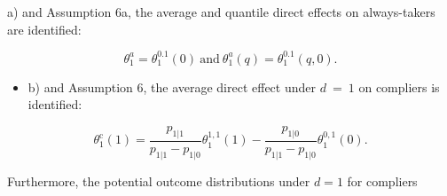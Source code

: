 \documentclass{article}
\begin{document}
a) and Assumption 6a, the average and quantile direct effects on always-takers
are identified:


\begin{equation}
\theta _ { 1 } ^ { a } = \theta _ { 1 } ^ { 0. 1 } ( 0 ) \mathrm { ~ a n d ~ } \theta _ { 1 } ^ { a } ( q ) = \theta _ { 1 } ^ { 0. 1 } ( q, 0 ).
\end{equation}

\begin{itemize}
\item b) and Assumption 6, the average direct effect under $d ~ = ~ 1$ on compliers is
identified:

\end{itemize}

\begin{equation}
\theta _ { 1 } ^ { \mathrm { c } } ( 1 ) = \frac { p _ { 1 | 1 } } { p _ { 1 | 1 } - p _ { 1 | 0 } } \theta _ { 1 } ^ { 1, 1 } ( 1 ) - \frac { p _ { 1 | 0 } } { p _ { 1 | 1 } - p _ { 1 | 0 } } \theta _ { 1 } ^ { 0, 1 } ( 0 ).
\end{equation}


Furthermore, the potential outcome distributions under $d = 1$ for compliers
\end{document}
